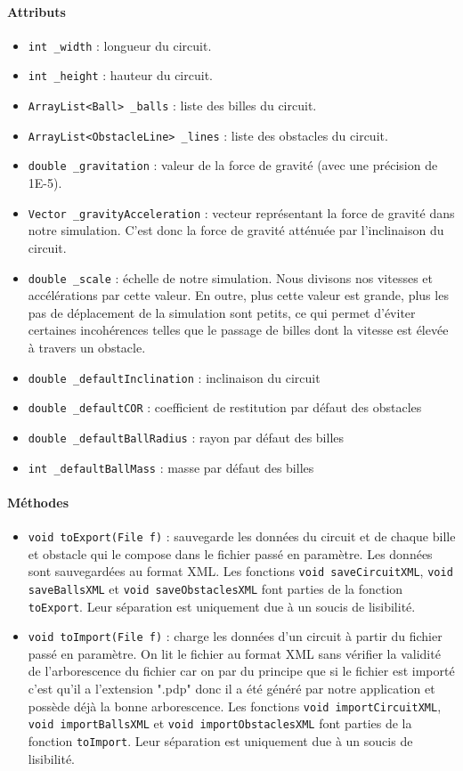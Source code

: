 \documentclass{report}
\begin{document}
\paragraph*{Attributs}
\begin{itemize}
\item \texttt{int \_width} : longueur du circuit.
\item \texttt{int \_height} : hauteur du circuit.
\item \texttt{ArrayList<Ball> \_balls} : liste des billes du circuit.
\item \texttt{ArrayList<ObstacleLine> \_lines} : liste des obstacles du circuit.
\item \texttt{double \_gravitation} : valeur de la force de gravité (avec une précision de 1E-5).
\item \texttt{Vector \_gravityAcceleration} : vecteur représentant la force de gravité dans notre simulation. C'est donc la force de gravité atténuée par l'inclinaison du circuit.
\item \texttt{double \_scale} : échelle de notre simulation. Nous divisons nos vitesses et accélérations par cette valeur. En outre, plus cette valeur est grande, plus les pas de déplacement de la simulation sont petits, ce qui permet d'éviter certaines incohérences telles que le passage de billes dont la vitesse est élevée à travers un obstacle.
\item \texttt{double \_defaultInclination} : inclinaison du circuit
\item \texttt{double \_defaultCOR} : coefficient de restitution par défaut des obstacles
\item \texttt{double \_defaultBallRadius} : rayon par défaut des billes
\item \texttt{int \_defaultBallMass} : masse par défaut des billes
\end{itemize}

\paragraph*{Méthodes}
\begin{itemize}
\item \texttt{void toExport(File f)} : sauvegarde les données du circuit et de chaque bille et obstacle qui le compose dans le fichier passé en paramètre. Les données sont sauvegardées au format XML. Les fonctions \texttt{void saveCircuitXML}, \texttt{void saveBallsXML} et \texttt{void saveObstaclesXML} font parties de la fonction \texttt{toExport}. Leur séparation est uniquement due à un soucis de lisibilité.
\item \texttt{void toImport(File f)} : charge les données d'un circuit à partir du fichier passé en paramètre. On lit le fichier au format XML sans vérifier la validité de l'arborescence du fichier car on par du principe que si le fichier est  importé c'est qu'il a l'extension ".pdp" donc il a été généré par notre application et possède déjà la bonne arborescence. Les fonctions \texttt{void importCircuitXML}, \texttt{void importBallsXML} et \texttt{void importObstaclesXML} font parties de la fonction \texttt{toImport}. Leur séparation est uniquement due à un soucis de lisibilité.
\end{itemize}
\end{document}
